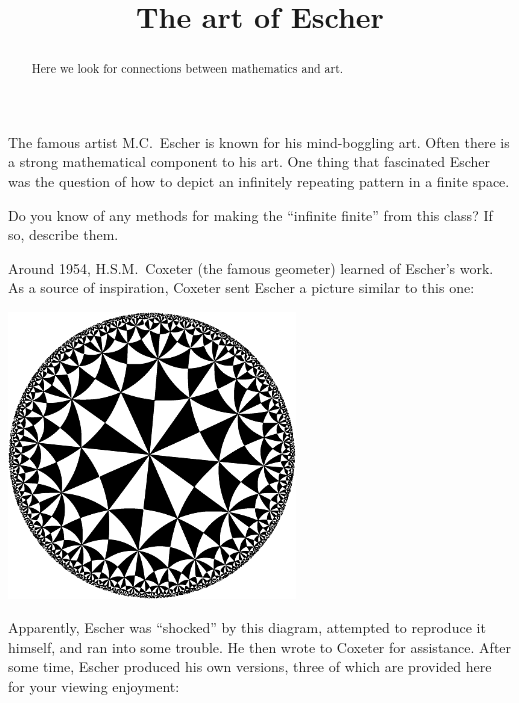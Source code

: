 \documentclass{ximera}
\title{The art of Escher}
\begin{document}
\begin{abstract}
Here we look for connections between mathematics and art.
\end{abstract}
\maketitle

The famous artist M.C.\ Escher is known for his mind-boggling
art. Often there is a strong mathematical component to his art. One
thing that fascinated Escher was the question of how to depict an
infinitely repeating pattern in a finite space.

\begin{problem}
  Do you know of any methods for making the ``infinite finite'' from
  this class? If so, describe them.
\end{problem}

Around 1954, H.S.M.\ Coxeter (the famous geometer) learned of Escher's
work. As a source of inspiration, Coxeter sent Escher a picture
similar to this one:
\begin{image}
  \includegraphics[width=3in]{inspiredCircleLimitIII.pdf}
\end{image}
Apparently, Escher was ``shocked'' by this diagram, attempted to
reproduce it himself, and ran into some trouble. He then wrote to
Coxeter for assistance. After some time, Escher produced his own
versions, three of which are provided here for your viewing enjoyment:
\end{document}
